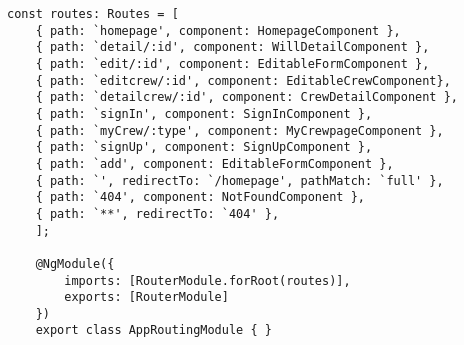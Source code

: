\begin{lstlisting}[style=Java, caption = {Implementazione del \textit{pattern} \textit{Lazy loading} nel \texttt{AppRoutingModule}}]
const routes: Routes = [
    { path: `homepage', component: HomepageComponent },
    { path: `detail/:id', component: WillDetailComponent },
    { path: `edit/:id', component: EditableFormComponent },
    { path: `editcrew/:id', component: EditableCrewComponent},
    { path: `detailcrew/:id', component: CrewDetailComponent },
    { path: `signIn', component: SignInComponent },
    { path: `myCrew/:type', component: MyCrewpageComponent },
    { path: `signUp', component: SignUpComponent },
    { path: `add', component: EditableFormComponent },
    { path: `', redirectTo: `/homepage', pathMatch: `full' },
    { path: `404', component: NotFoundComponent },
    { path: `**', redirectTo: `404' },
    ];
    
    @NgModule({
        imports: [RouterModule.forRoot(routes)],
        exports: [RouterModule]
    })
    export class AppRoutingModule { }  
\end{lstlisting}